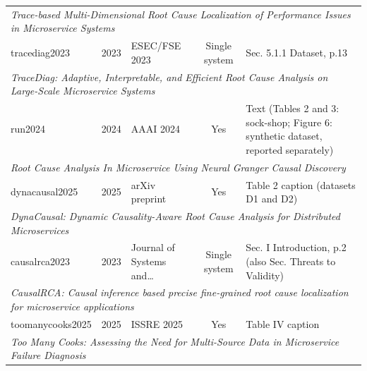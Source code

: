 {\begin{longtable}{lllcp{5.2cm}}
\multicolumn{5}{l}{\scriptsize\textit{Trace-based Multi-Dimensional Root Cause Localization of Performance Issues in Microservice Systems}} \\
tracediag2023 & 2023 & ESEC/FSE 2023 & Single system & Sec. 5.1.1 Dataset, p.13 \\
\multicolumn{5}{l}{\scriptsize\textit{TraceDiag: Adaptive, Interpretable, and Efficient Root Cause Analysis on Large-Scale Microservice Systems}} \\
run2024 & 2024 & AAAI 2024 & Yes & Text (Tables 2 and 3: sock-shop; Figure 6: synthetic dataset, reported separately) \\
\multicolumn{5}{l}{\scriptsize\textit{Root Cause Analysis In Microservice Using Neural Granger Causal Discovery}} \\
dynacausal2025 & 2025 & arXiv preprint & Yes & Table 2 caption (datasets D1 and D2) \\
\multicolumn{5}{l}{\scriptsize\textit{DynaCausal: Dynamic Causality-Aware Root Cause Analysis for Distributed Microservices}} \\
causalrca2023 & 2023 & Journal of Systems and\ldots & Single system & Sec. I Introduction, p.2 (also Sec. Threats to Validity) \\
\multicolumn{5}{l}{\scriptsize\textit{CausalRCA: Causal inference based precise fine-grained root cause localization for microservice applications}} \\
toomanycooks2025 & 2025 & ISSRE 2025 & Yes & Table IV caption \\
\multicolumn{5}{l}{\scriptsize\textit{Too Many Cooks: Assessing the Need for Multi-Source Data in Microservice Failure Diagnosis}} \\
\end{longtable}
}
